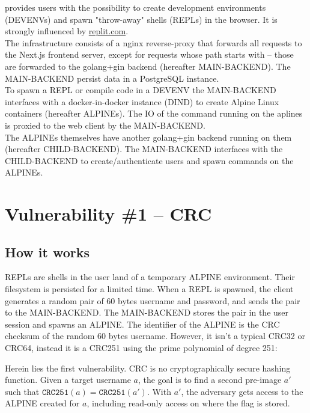 \documentclass[10pt]{article}
\begin{document}
 provides users with the possibility to create development environments (DEVENVs) and spawn "throw-away" shells (REPLs) in the browser. It is strongly influenced by \href{https://replit.com}{replit.com}. \\

The infrastructure consists of a nginx reverse-proxy that forwards all requests to the Next.js frontend server, except for requests whose path starts with  -- those are forwarded to the golang+gin backend (hereafter MAIN-BACKEND). The MAIN-BACKEND persist data in a PostgreSQL instance. \\

To spawn a REPL or compile code in a DEVENV the MAIN-BACKEND interfaces with a docker-in-docker instance (DIND) to create Alpine Linux containers (hereafter ALPINEs). The IO of the command running on the aplines is proxied to the web client by the MAIN-BACKEND. \\

The ALPINEs themselves have another golang+gin backend running on them (hereafter CHILD-BACKEND). The MAIN-BACKEND interfaces with the CHILD-BACKEND to create/authenticate users and spawn commands on the ALPINEs.
\section{Vulnerability \#1 -- CRC}

\subsection{How it works}

REPLs are  shells in the user land of a temporary ALPINE environment. Their filesystem is persisted for a limited time. When a REPL is spawned, the client generates a random pair of 60 bytes username and password, and sends the pair to the MAIN-BACKEND. The MAIN-BACKEND stores the pair in the user session and spawns an ALPINE. The identifier of the ALPINE is the CRC checksum of the random 60 bytes username. However, it isn't a typical CRC32 or CRC64, instead it is a CRC251 using the prime polynomial of degree 251:
\begin{center}
\end{center}

Herein lies the first vulnerability. CRC is no cryptographically secure hashing function. Given a target username $a$, the goal is to find a second pre-image $a'$ such that $\texttt{CRC251}(a) = \texttt{CRC251}(a')$. With $a'$, the adversary gets access to the ALPINE created for $a$, including read-only access on  where the flag is stored. \\
\end{document}
